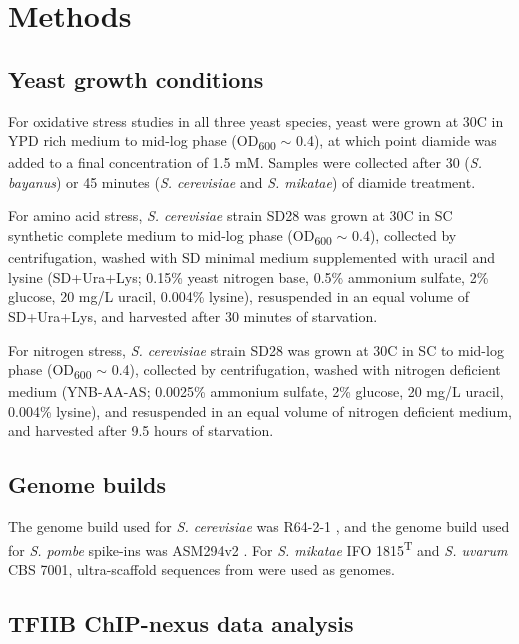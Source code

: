 \section{Methods}

\subsection{Yeast growth conditions}
\label{subsec:stress_growth_conditions}

For oxidative stress studies in all three yeast species, yeast were grown at 30\textdegree C in YPD rich medium to mid-log phase (OD\textsubscript{600} $\sim$ 0.4), at which point diamide was added to a final concentration of 1.5 mM.
Samples were collected after 30 (\textit{S. bayanus}) or 45 minutes (\textit{S. cerevisiae} and \textit{S. mikatae}) of diamide treatment.

For amino acid stress, \textit{S. cerevisiae} strain SD28 was grown at 30\textdegree C in SC synthetic complete medium to mid-log phase (OD\textsubscript{600} $\sim$ 0.4), collected by centrifugation, washed with SD minimal medium supplemented with uracil and lysine (SD+Ura+Lys; 0.15\% yeast nitrogen base, 0.5\% ammonium sulfate, 2\% glucose, 20 mg/L uracil, 0.004\% lysine), resuspended in an equal volume of SD+Ura+Lys, and harvested after 30 minutes of starvation.

For nitrogen stress, \textit{S. cerevisiae} strain SD28 was grown at 30\textdegree C in SC to mid-log phase (OD\textsubscript{600} $\sim$ 0.4), collected by centrifugation, washed with nitrogen deficient medium (YNB-AA-AS; 0.0025\% ammonium sulfate, 2\% glucose, 20 mg/L uracil, 0.004\% lysine), and resuspended in an equal volume of nitrogen deficient medium, and harvested after 9.5 hours of starvation.

\subsection{Genome builds}

The genome build used for \textit{S. cerevisiae} was R64-2-1 \citep{engel2014}, and the genome build used for \textit{S. pombe} spike-ins was ASM294v2 \citep{wood2002}.
For \textit{S. mikatae }IFO 1815\textsuperscript{T} and \textit{S. uvarum }CBS 7001, ultra-scaffold sequences from \citet{scannell11} were used as genomes.

\subsection{TFIIB ChIP-nexus data analysis}

